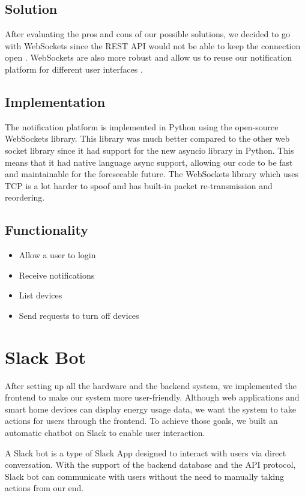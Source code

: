 \documentclass[conference]{IEEEtran}
\begin{document}
\subsection{Solution}
After evaluating the pros and cons of our possible solutions, we decided to go with WebSockets since the REST API would not be able to keep the connection open \cite{b5}. WebSockets are also more robust and allow us to reuse our notification platform for different user interfaces \cite{b6}.

\subsection{Implementation}
The notification platform is implemented in Python using the open-source WebSockets library. This library was much better compared to the other web socket library since it had support for the new asyncio library in Python. This means that it had native language async support, allowing our code to be fast and maintainable for the foreseeable future. The WebSockets library which uses TCP is a lot harder to spoof and has built-in packet re-transmission and reordering.

\subsection{Functionality}
\begin{itemize}
    \item Allow a user to login
    \item Receive notifications
    \item List devices
    \item Send requests to turn off devices
\end{itemize}

\section{Slack Bot}
After setting up all the hardware and the backend system, we implemented the frontend to make our system more user-friendly. Although web applications and smart home devices can display energy usage data, we want the system to take actions for users through the frontend. To achieve those goals, we built an automatic chatbot on Slack to enable user interaction.

A Slack bot is a type of Slack App designed to interact with users via direct conversation. With the support of the backend database and the API protocol, Slack bot can communicate with users without the need to manually taking actions from our end.
\end{document}
